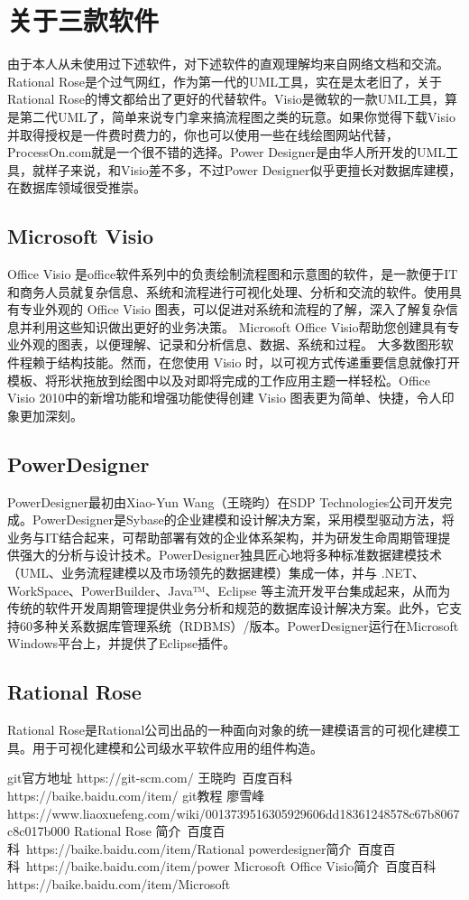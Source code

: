 \documentclass{article}
\begin{document}
	\section{关于三款软件}
	由于本人从未使用过下述软件，对下述软件的直观理解均来自网络文档和交流。Rational Rose是个过气网红，作为第一代的UML工具，实在是太老旧了，关于Rational Rose的博文都给出了更好的代替软件。Visio是微软的一款UML工具，算是第二代UML了，简单来说专门拿来搞流程图之类的玩意。如果你觉得下载Visio并取得授权是一件费时费力的，你也可以使用一些在线绘图网站代替，ProcessOn.com就是一个很不错的选择。Power Designer是由华人所开发的UML工具，就样子来说，和Visio差不多，不过Power Designer似乎更擅长对数据库建模，在数据库领域很受推崇。
	\subsection{Microsoft Visio}
	Office Visio 是office软件系列中的负责绘制流程图和示意图的软件，是一款便于IT和商务人员就复杂信息、系统和流程进行可视化处理、分析和交流的软件。使用具有专业外观的 Office Visio 图表，可以促进对系统和流程的了解，深入了解复杂信息并利用这些知识做出更好的业务决策。
	Microsoft Office Visio帮助您创建具有专业外观的图表，以便理解、记录和分析信息、数据、系统和过程。
	大多数图形软件程赖于结构技能。然而，在您使用 Visio 时，以可视方式传递重要信息就像打开模板、将形状拖放到绘图中以及对即将完成的工作应用主题一样轻松。Office Visio 2010中的新增功能和增强功能使得创建 Visio 图表更为简单、快捷，令人印象更加深刻。
	\subsection{PowerDesigner}
	PowerDesigner最初由Xiao-Yun Wang（王晓昀）在SDP Technologies公司开发完成。PowerDesigner是Sybase的企业建模和设计解决方案，采用模型驱动方法，将业务与IT结合起来，可帮助部署有效的企业体系架构，并为研发生命周期管理提供强大的分析与设计技术。PowerDesigner独具匠心地将多种标准数据建模技术（UML、业务流程建模以及市场领先的数据建模）集成一体，并与 .NET、WorkSpace、PowerBuilder、Java™、Eclipse 等主流开发平台集成起来，从而为传统的软件开发周期管理提供业务分析和规范的数据库设计解决方案。此外，它支持60多种关系数据库管理系统（RDBMS）/版本。PowerDesigner运行在Microsoft Windows平台上，并提供了Eclipse插件。
	\subsection{Rational Rose}
	Rational Rose是Rational公司出品的一种面向对象的统一建模语言的可视化建模工具。用于可视化建模和公司级水平软件应用的组件构造。
	\begin{thebibliography}{99}
		\bibitem{}git官方地址 https://git-scm.com/
		\bibitem{}王晓昀\ 百度百科 https://baike.baidu.com/item/%
		\bibitem{}git教程 廖雪峰
		\\ https://www.liaoxuefeng.com/wiki/0013739516305929606dd18361248578c67b8067c8c017b000
		\bibitem{}Rational Rose 简介\ 百度百科\ https://baike.baidu.com/item/Rational%
		\bibitem{}powerdesigner简介\ 百度百科\ https://baike.baidu.com/item/power%
		\bibitem{}Microsoft Office Visio简介\ 百度百科 \\ https://baike.baidu.com/item/Microsoft%
		
	\end{thebibliography}
\end{document}

